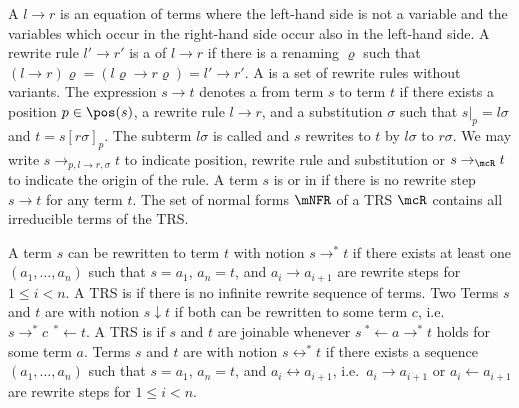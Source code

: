 \begin{definition}
A   $l \rightarrow r$ is an equation of terms where the left-hand side is not a variable
and the variables which occur in the right-hand side occur also in the left-hand side.
A rewrite rule $l'\rightarrow r'$ is a  of $l\rightarrow r$ if there is a renaming $\varrho$ such that
$(l\rightarrow r)\varrho = (l\varrho\rightarrow r\varrho) = l'\rightarrow r'$.
A  is a set of rewrite rules without variants.
%
The expression $s\rightarrow t$ denotes a 
from term $s$ to term $t$
if there exists
a position $p\in\pos(s)$,
a rewrite rule $l\rightarrow r$,
and a substitution $\sigma$ such that
$s|_p=l\sigma$ and $t=s[r\sigma]_p$.
The subterm $l\sigma$ is called  and
$s$ rewrites to $t$ by  $l\sigma$ to  $r\sigma$.
%
We may write
$s\rightarrow_{p,l\rightarrow r,\sigma}t$ to indicate position, rewrite rule and substitution
or $s\rightarrow_\mcR t$ to indicate the origin of the rule.
%
A term $s$ is  or in  if there is no rewrite step $s\rightarrow t$ for any term $t$.
The set of normal forms $\mNFR$ of a TRS $\mcR$ contains all irreducible terms of the TRS.
%
\end{definition}
\begin{definition}
A term $s$ can be rewritten to term $t$ with notion $s\rightarrow^* t$
if there exists at least one  $(a_1,\ldots ,a_n)$ such that
$s=a_1$, $a_n=t$, and $a_i\rightarrow a_{i+1}$ are rewrite steps for $1\leq i<n$.
A TRS is  if there is no infinite rewrite sequence of terms.
%
Two Terms $s$ and $t$ are  with notion $s\downarrow t$
if both can be rewritten to some term $c$, i.e.~$s \rightarrow^*c\ \, ^*\!\!\leftarrow t$.
A TRS is  if $s$ and $t$ are joinable whenever $s\ ^*\!\!\leftarrow a \rightarrow^* t$ holds for some term $a$.
%
Terms $s$ and $t$ are  with notion $s\leftrightarrow^* t$
if there exists a sequence $(a_1,\ldots ,a_n)$ such that
$s=a_1$, $a_n=t$, and $a_i\leftrightarrow a_{i+1}$, i.e.~$a_i\rightarrow a_{i+1}$ or $a_i\leftarrow a_{i+1}$ are rewrite steps for $1\leq i<n$.
\end{definition}

